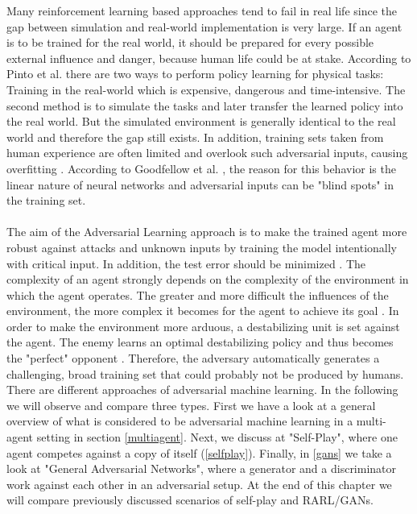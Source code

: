 Many reinforcement learning based approaches tend to fail in real life since the gap between simulation and real-world implementation is very large. If an agent is to be trained for the real world, it should be prepared for every possible external influence and danger, because human life could be at stake. According to Pinto et al. \cite{robustPinto2017Mar} there are two ways to perform policy learning for physical tasks: Training in the real-world which is expensive, dangerous and time-intensive. The second method is to simulate the tasks and later transfer the learned policy into the real world. But the simulated environment is generally identical to the real world and therefore the gap still exists. In addition, training sets taken from human experience are often limited and overlook such adversarial inputs, causing overfitting \cite{robustPinto2017Mar}. According to Goodfellow et al. \cite{harnessing_goodfellow}, the reason for this behavior is the linear nature of neural networks and adversarial inputs can be "blind spots" in the training set.\\
\\
The aim of the Adversarial Learning approach is to make the trained agent more robust against attacks and unknown inputs by training the model intentionally with critical input. In addition, the test error should be minimized \cite{MachineLearningAtScale}.
The complexity of an agent strongly depends on the complexity of the environment in which the agent operates. The greater and more difficult the influences of the environment, the more complex it becomes for the agent to achieve its goal \cite{environmentBansal2017Oct}.
In order to make the environment more arduous, a destabilizing unit is set against the agent. The enemy learns an optimal destabilizing policy and thus becomes the "perfect" opponent \cite{robustPinto2017Mar}. Therefore, the adversary automatically generates a challenging, broad training set that could probably not be produced by humans.
There are different approaches of adversarial machine learning. In the following we will observe and compare three types. First we have a look at a general overview of what is considered to be adversarial machine learning in a multi-agent setting in section \ref{multiagent}. Next, we discuss at "Self-Play", where one agent competes against a copy of itself (\ref{selfplay}). Finally, in \ref{gans} we take a look at "General Adversarial Networks", where a generator and a discriminator work against each other in an adversarial setup.
At the end of this chapter we will compare previously discussed scenarios of self-play and RARL/GANs. 
